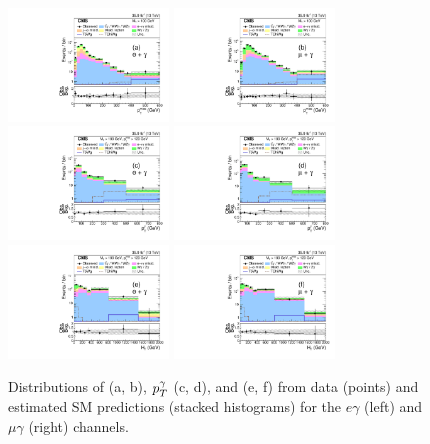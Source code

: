 \documentclass[thesis.tex]{subfiles}
\renewcommand\_{\textunderscore\allowbreak}
\begin{document}
\begin{figure}[tb]
\centering
\includegraphics[width=0.38\textwidth]{Fig/Figure_004-a.pdf}
\includegraphics[width=0.38\textwidth]{Fig/Figure_004-b.pdf} \\
\includegraphics[width=0.38\textwidth]{Fig/Figure_004-c.pdf}
\includegraphics[width=0.38\textwidth]{Fig/Figure_004-d.pdf} \\
\includegraphics[width=0.38\textwidth]{Fig/Figure_004-e.pdf}
\includegraphics[width=0.38\textwidth]{Fig/Figure_004-f.pdf}
\caption{Distributions of \ptmiss (a, b), $p_T^{\mathrm{\gamma}}$ (c, d), and \HT
  (e, f) from data (points) and estimated SM predictions (stacked
  histograms) for the $e\gamma$ (left) and $\mu\gamma$ (right)
  channels.}
\label{fig:signalPhoPt} 
\end{figure}
\end{document}
